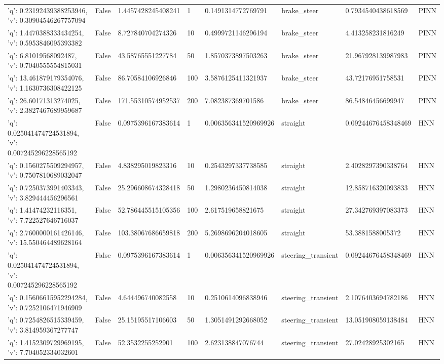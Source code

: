 \begin{tabular}{llllllll}
{'q': 0.23192439388253946, 'v': 0.30904546267757094} & False & 1.4457428245408241 & 1 & 0.1491314772769791 & brake\_steer & 0.7934540438618569 & PINN \\
{'q': 1.4470388333434254, 'v': 0.5953846095393382} & False & 8.727840704274326 & 10 & 0.4999721146296194 & brake\_steer & 4.413258231816249 & PINN \\
{'q': 6.81019568092487, 'v': 0.7040555554815031} & False & 43.58765551227784 & 50 & 1.8570373897503263 & brake\_steer & 21.967928139987983 & PINN \\
{'q': 13.461879179354076, 'v': 1.1630736308422125} & False & 86.70584106926846 & 100 & 3.5876125411321937 & brake\_steer & 43.72176951758531 & PINN \\
{'q': 26.60171313274025, 'v': 2.3827467689959687} & False & 171.55310574952537 & 200 & 7.082387369701586 & brake\_steer & 86.54846456699947 & PINN \\
{'q': 0.025041474724531894, 'v': 0.007245296228565192} & False & 0.0975396167383614 & 1 & 0.006356341520969926 & straight & 0.09244676458348469 & HNN \\
{'q': 0.1560275509294957, 'v': 0.7507810689032047} & False & 4.838295019823316 & 10 & 0.2543297337738585 & straight & 2.4028297390338764 & HNN \\
{'q': 0.7250373991403343, 'v': 3.829444456296561} & False & 25.296608674328418 & 50 & 1.2980236450814038 & straight & 12.858716320093833 & HNN \\
{'q': 1.41474232116351, 'v': 7.722527646716037} & False & 52.786445515105356 & 100 & 2.617519658821675 & straight & 27.342769397083373 & HNN \\
{'q': 2.7600000161426146, 'v': 15.550464489628164} & False & 103.38067686659818 & 200 & 5.2698696204018605 & straight & 53.3881588005372 & HNN \\
{'q': 0.025041474724531894, 'v': 0.007245296228565192} & False & 0.0975396167383614 & 1 & 0.006356341520969926 & steering\_transient & 0.09244676458348469 & HNN \\
{'q': 0.15606615952294284, 'v': 0.7252106471946909} & False & 4.644496740082558 & 10 & 0.2510614096838946 & steering\_transient & 2.1076403694782186 & HNN \\
{'q': 0.7254826515339459, 'v': 3.814959367277747} & False & 25.15195517106603 & 50 & 1.3051491292668052 & steering\_transient & 13.051908059138484 & HNN \\
{'q': 1.4152309729969195, 'v': 7.704052334032601} & False & 52.3532255252901 & 100 & 2.623138847076744 & steering\_transient & 27.02428925302165 & HNN \\

\end{tabular}
